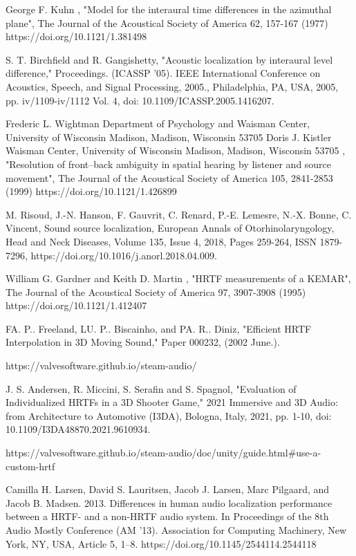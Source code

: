 \documentclass[conference]{IEEEtran}
\begin{document}
\begin{thebibliography}{00}
 George F. Kuhn , "Model for the interaural time differences in the azimuthal plane", The Journal of the Acoustical Society of America 62, 157-167 (1977) https://doi.org/10.1121/1.381498

 S. T. Birchfield and R. Gangishetty, "Acoustic localization by interaural level difference," Proceedings. (ICASSP '05). IEEE International Conference on Acoustics, Speech, and Signal Processing, 2005., Philadelphia, PA, USA, 2005, pp. iv/1109-iv/1112 Vol. 4, doi: 10.1109/ICASSP.2005.1416207.

 Frederic L. Wightman
Department of Psychology and Waisman Center, University of Wisconsin Madison, Madison, Wisconsin 53705
Doris J. Kistler
Waisman Center, University of Wisconsin Madison, Madison, Wisconsin 53705
, "Resolution of front–back ambiguity in spatial hearing by listener and source movement", The Journal of the Acoustical Society of America 105, 2841-2853 (1999) https://doi.org/10.1121/1.426899

 M. Risoud, J.-N. Hanson, F. Gauvrit, C. Renard, P.-E. Lemesre, N.-X. Bonne, C. Vincent,
Sound source localization,
European Annals of Otorhinolaryngology, Head and Neck Diseases,
Volume 135, Issue 4,
2018,
Pages 259-264,
ISSN 1879-7296,
https://doi.org/10.1016/j.anorl.2018.04.009.

 William G. Gardner and Keith D. Martin , "HRTF measurements of a KEMAR", The Journal of the Acoustical Society of America 97, 3907-3908 (1995) https://doi.org/10.1121/1.412407

 FA. P..  Freeland, LU. P..   Biscainho, and PA. R..   Diniz, "Efficient HRTF Interpolation in 3D Moving Sound," Paper 000232, (2002 June.).

 https://valvesoftware.github.io/steam-audio/

 J. S. Andersen, R. Miccini, S. Serafin and S. Spagnol, "Evaluation of Individualized HRTFs in a 3D Shooter Game," 2021 Immersive and 3D Audio: from Architecture to Automotive (I3DA), Bologna, Italy, 2021, pp. 1-10, doi: 10.1109/I3DA48870.2021.9610934.

 https://valvesoftware.github.io/steam-audio/doc/unity/guide.html\#use-a-custom-hrtf

 Camilla H. Larsen, David S. Lauritsen, Jacob J. Larsen, Marc Pilgaard, and Jacob B. Madsen. 2013. Differences in human audio localization performance between a HRTF- and a non-HRTF audio system. In Proceedings of the 8th Audio Mostly Conference (AM '13). Association for Computing Machinery, New York, NY, USA, Article 5, 1–8. https://doi.org/10.1145/2544114.2544118


\end{thebibliography}
\end{document}
